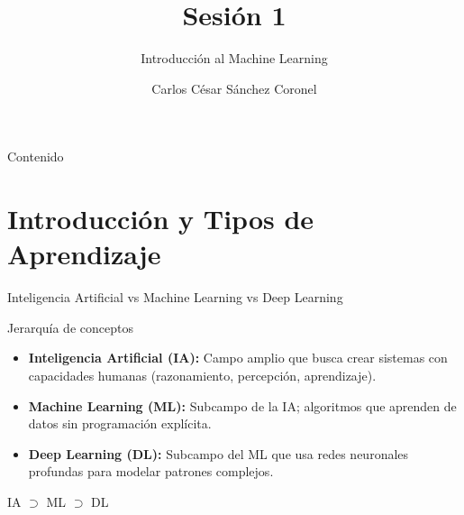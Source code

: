 \documentclass[aspectratio=169, 10pt, xcolor=table]{beamer}
\title[SESIÓN 1]{\textbf{Sesión 1}}
\subtitle{Introducción al Machine Learning}
\author[Prof. C. Sánchez]{Carlos César Sánchez Coronel}
\institute{\textbf{MACHINE LEARNING}}
\date{}
\begin{document}
\begin{frame}
    \titlepage
\end{frame}

\begin{frame}{Contenido}
    \tableofcontents
\end{frame}

\section{Introducción y Tipos de Aprendizaje}

\begin{frame}{Inteligencia Artificial vs Machine Learning vs Deep Learning}
    \begin{block}{Jerarquía de conceptos}
        \begin{itemize}
            \item \textbf{Inteligencia Artificial (IA):} Campo amplio que busca crear sistemas con capacidades humanas (razonamiento, percepción, aprendizaje).
            \item \textbf{Machine Learning (ML):} Subcampo de la IA; algoritmos que aprenden de datos sin programación explícita.
            \item \textbf{Deep Learning (DL):} Subcampo del ML que usa redes neuronales profundas para modelar patrones complejos.
        \end{itemize}
        \vspace{0.3cm}
        \centering
        IA $\supset$ ML $\supset$ DL
    \end{block}
\end{frame}
\end{document}
